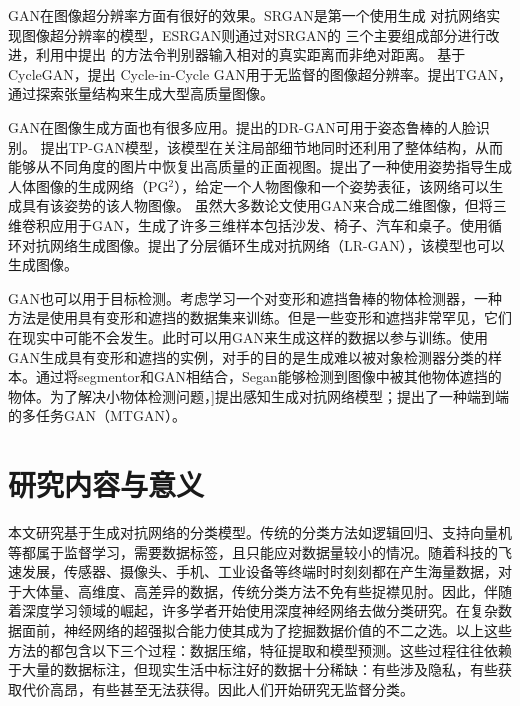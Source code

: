 GAN在图像超分辨率方面有很好的效果。SRGAN\cite{ledig2017photo}是第一个使用生成
对抗网络实现图像超分辨率的模型，ESRGAN\cite{wang2018esrgan}则通过对SRGAN的
三个主要组成部分进行改进，利用\citet{jolicoeur2018relativistic}中提出
的方法令判别器输入相对的真实距离而非绝对距离。
基于CycleGAN\cite{zhu2017unpaired}，\citet{yuan2018unsupervised}提出
Cycle-in-Cycle GAN用于无监督的图像超分辨率。\citet{ding2019tgan}提出TGAN，
通过探索张量结构来生成大型高质量图像。

GAN在图像生成方面也有很多应用。\citet{tran2017disentangled}提出的DR-GAN可用于姿态鲁棒的人脸识别。
\citet{huang2017beyond}提出TP-GAN模型，该模型在关注局部细节地同时还利用了整体结构，从而能够从不同角度的图片中恢复出高质量的正面视图。\citet{ma2017pose}提出了一种使用姿势指导生成人体图像的生成网络（PG$^2$），给定一个人物图像和一个姿势表征，该网络可以生成具有该姿势的该人物图像。
虽然大多数论文使用GAN来合成二维图像\cite{bao2017cvae,dong2017semantic}，但\citet{wu2016learning}将三维卷积应用于GAN，生成了许多三维样本包括沙发、椅子、汽车和桌子。\citet{im2016generating}使用循环对抗网络生成图像。\citet{yang2017lr}提出了分层循环生成对抗网络（LR-GAN），该模型也可以生成图像。

GAN也可以用于目标检测。考虑学习一个对变形和遮挡鲁棒的物体检测器，一种方法是使用具有变形和遮挡的数据集来训练。但是一些变形和遮挡非常罕见，它们在现实中可能不会发生。此时可以用GAN来生成这样的数据以参与训练。\citet{wang2017fast}使用GAN生成具有变形和遮挡的实例，对手的目的是生成难以被对象检测器分类的样本。通过将segmentor和GAN相结合，Segan\cite{ehsani2018segan}能够检测到图像中被其他物体遮挡的物体。为了解决小物体检测问题，\citet{li2017perceptual}]提出感知生成对抗网络模型；\citet{bai2018sod}提出了一种端到端的多任务GAN（MTGAN）。

\section{研究内容与意义}
本文研究基于生成对抗网络的分类模型。传统的分类方法如逻辑回归、支持向量机等都属于监督学习，需要数据标签，且只能应对数据量较小的情况。随着科技的飞速发展，传感器、摄像头、手机、工业设备等终端时时刻刻都在产生海量数据，对于大体量、高维度、高差异的数据，传统分类方法不免有些捉襟见肘。因此，伴随着深度学习领域的崛起，许多学者开始使用深度神经网络去做分类研究\cite{krizhevsky2012imagenet,taigman2014deepface}。在复杂数据面前，神经网络的超强拟合能力使其成为了挖掘数据价值的不二之选。以上这些方法的都包含以下三个过程：数据压缩，特征提取和模型预测。这些过程往往依赖于大量的数据标注，但现实生活中标注好的数据十分稀缺：有些涉及隐私，有些获取代价高昂，有些甚至无法获得。因此人们开始研究无监督分类。

